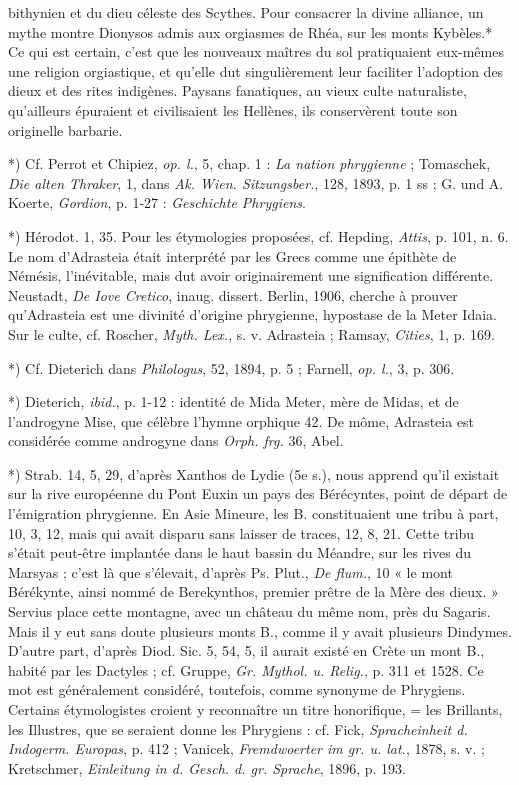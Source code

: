 \documentclass[a4paper, 11pt, oneside, polutonikogreek, french]{article}
\begin{document}
bithynien et du dieu céleste des Scythes. Pour consacrer la divine alliance, un mythe montre Dionysos admis aux orgiasmes de Rhéa, sur les monts Kybèles.* Ce qui est certain, c'est que les nouveaux maîtres du sol pratiquaient eux-mêmes une religion orgiastique, et qu'elle dut singulièrement leur faciliter l'adoption des dieux et des rites indigènes. Paysans fanatiques, au vieux culte naturaliste, qu'ailleurs épuraient et civilisaient les Hellènes, ils conservèrent toute son originelle barbarie.

*) Cf. Perrot et Chipiez, \emph{op. l.}, 5, chap. 1 : \emph{La nation phrygienne} ; Tomaschek, \emph{Die alten Thraker}, 1, dans \emph{Ak. Wien. Sitzungsber.}, 128, 1893, p. 1 ss ; G. und A. Koerte, \emph{Gordion}, p. 1-27 : \emph{Geschichte Phrygiens}.

*) Hérodot. 1, 35. Pour les étymologies proposées, cf. Hepding, \emph{Attis}, p. 101, n. 6. Le nom d'Adrasteia était interprété par les Grecs comme une épithète de Némésis, l'inévitable, mais dut avoir originairement une signification différente. Neustadt, \emph{De Iove Cretico}, inaug. dissert. Berlin, 1906, cherche à prouver qu'Adrasteia est une divinité d'origine phrygienne, hypostase de la Meter Idaia. Sur le culte, cf. Roscher, \emph{Myth. Lex.}, s. v. Adrasteia ; Ramsay, \emph{Cities}, 1, p. 169.

*) Cf. Dieterich dans \emph{Philologus}, 52, 1894, p. 5 ; Farnell, \emph{op. l.}, 3, p. 306.

*) Dieterich, \emph{ibid.}, p. 1-12 : identité de Mida Meter, mère de Midas, et de l'androgyne Mise, que célèbre l'hymne orphique 42. De môme, Adrasteia est considérée comme androgyne dans \emph{Orph. frg.} 36, Abel.

*) Strab. 14, 5, 29, d'après Xanthos de Lydie (5e s.), nous apprend qu'il existait sur la rive européenne du Pont Euxin un pays des Bérécyntes, point de départ de l'émigration phrygienne. En Asie Mineure, les B. constituaient une tribu à part, 10, 3, 12, mais qui avait disparu sans laisser de traces, 12, 8, 21. Cette tribu s'était peut-être implantée dans le haut bassin du Méandre, sur les rives du Marsyas ; c'est là que s'élevait, d'après Ps. Plut., \emph{De flum.}, 10 « le mont Bérékynte, ainsi nommé de Berekynthos, premier prêtre de la Mère des dieux. » Servius place cette montagne, avec un château du même nom, près du Sagaris. Mais il y eut sans doute plusieurs monts B., comme il y avait plusieurs Dindymes. D'autre part, d'après Diod. Sic. 5, 54, 5, il aurait existé en Crète un mont B., habité par les Dactyles ; cf. Gruppe, \emph{Gr. Mythol. u. Relig.}, p. 311 et 1528. Ce mot est généralement considéré, toutefois, comme synonyme de Phrygiens. Certains étymologistes croient y reconnaître un titre honorifique, = les Brillants, les Illustres, que se seraient donne les Phrygiens : cf. Fick, \emph{Spracheinheit d. Indogerm. Europas}, p. 412 ; Vanicek, \emph{Fremdwoerter im gr. u. lat.}, 1878, s. v. ; Kretschmer, \emph{Einleitung in d. Gesch. d. gr. Sprache}, 1896, p. 193.
\end{document}

